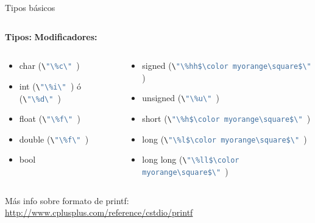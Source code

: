 \documentclass{mybeamer}
\begin{document}
\def\fpf[#1]{(\lstinline[language=C]!\"\%#1\" !)}
\begin{framesec}{Tipos básicos}
	\begin{columns}[onlytextwidth]
		\textbf{Tipos:}
		\textbf{Modificadores:}
	\end{columns}

	\begin{columns}[onlytextwidth]
	\begin{column}{0.5\textwidth}
		\begin{itemize}
			\item char \fpf[c]
			\item int \fpf[i] ó \fpf[d]
			\item float \fpf[f]
			\item double \fpf[f]
			\item bool
		\end{itemize}
	\end{column}

	\begin{column}{0.5\textwidth}
		\begin{itemize}
			\item signed \fpf[hh$\color{myorange}\square$]
			\item unsigned \fpf[u]
			\item short \fpf[h$\color{myorange}\square$]
			\item long \fpf[l$\color{myorange}\square$]
			\item long long \fpf[ll$\color{myorange}\square$]
		\end{itemize}
	\end{column}
	\end{columns}
	\vspace{2em}
	\centering
	Más info sobre formato de printf: \url{http://www.cplusplus.com/reference/cstdio/printf}
\end{framesec}
\let\fpf\undefined
\end{document}
